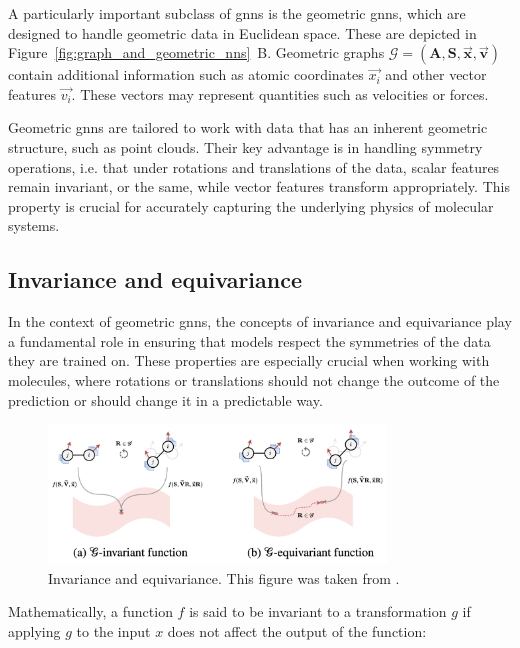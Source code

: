 A particularly important subclass of \acp{gnn} is the geometric \acp{gnn}, which are designed to handle geometric data in Euclidean space. These are depicted in Figure~\ref{fig:graph_and_geometric_nns}~B. Geometric graphs $\mathcal{G} = (\mathbf{A}, \mathbf{S}, \overrightarrow{\mathbf{x}}, \overrightarrow{\mathbf{v}})$ contain additional information such as atomic coordinates $\overrightarrow{x_i}$ and other vector features $\overrightarrow{v_i}$. These vectors may represent quantities such as velocities or forces.

Geometric \acp{gnn} are tailored to work with data that has an inherent geometric structure, such as point clouds. Their key advantage is in handling symmetry operations, i.e. that under rotations and translations of the data, scalar features remain invariant, or the same, while vector features transform appropriately. This property is crucial for accurately capturing the underlying physics of molecular systems.

\subsection{Invariance and equivariance}

In the context of geometric \acp{gnn}, the concepts of invariance and equivariance play a fundamental role in ensuring that models respect the symmetries of the data they are trained on. These properties are especially crucial when working with molecules, where rotations or translations should not change the outcome of the prediction or should change it in a predictable way.

\begin{figure}[t!]
    \centering
    \includegraphics[width=0.8\textwidth]{Figures/2_Theory/invariance_equivariance.png}
    \caption{Invariance and equivariance. This figure was taken from \citep{duvalHitchhikersGuideGeometric2024}.}
    \label{fig:invariance_equivariance}
\end{figure}

Mathematically, a function $f$ is said to be invariant to a transformation $g$ if applying $g$ to the input $x$ does not affect the output of the function:

